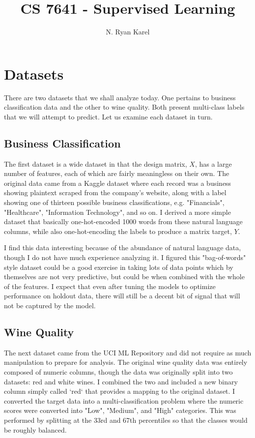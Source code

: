 \documentclass[
	letterpaper, %
]{jdf}
\author{N. Ryan Karel}
\title{CS 7641 - Supervised Learning}
\begin{document}

\maketitle

\section{Datasets}
There are two datasets that we shall analyze today. One pertains to business classification data and the other to wine quality. Both present multi-class labels that we will attempt to predict. Let us examine each dataset in turn.

\subsection{Business Classification}
The first dataset is a wide dataset in that the design matrix, $X$, has a large number of features, each of which are fairly meaningless on their own. The original data came from a Kaggle dataset where each record was a business showing plaintext scraped from the company's website, along with a label showing one of thirteen possible business classifications, e.g. "Financials", "Healthcare", "Information Technology", and so on. I derived a more simple dataset that basically one-hot-encoded 1000 words from these natural language columns, while also one-hot-encoding the labels to produce a matrix target, $Y$. 

I find this data interesting because of the abundance of natural language data, though I do not have much experience analyzing it. I figured this "bag-of-words" style dataset could be a good exercise in taking lots of data points which by themselves are not very predictive, but could be when combined with the whole of the features. I expect that even after tuning the models to optimize performance on holdout data, there will still be a decent bit of signal that will not be captured by the model.

\subsection{Wine Quality}
The next dataset came from the UCI ML Repository and did not require as much manipulation to prepare for analysis. The original wine quality data was entirely composed of numeric columns, though the data was originally split into two datasets: red and white wines. I combined the two and included a new binary column simply called `red` that provides a mapping to the original dataset. I converted the target data into a multi-classification problem where the numeric scores were converted into "Low", "Medium", and "High" categories. This was performed by splitting at the 33rd and 67th percentiles so that the classes would be roughly balanced.
\end{document}
